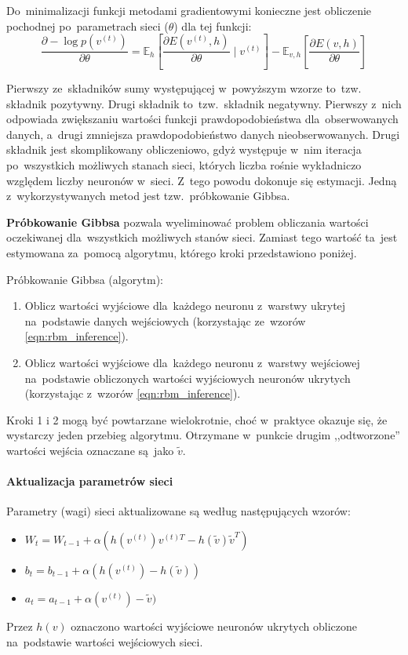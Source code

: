 Do~minimalizacji funkcji metodami gradientowymi konieczne jest obliczenie pochodnej po~parametrach sieci ($\theta$)
dla tej funkcji:
$$\frac{\partial-\log{p(v^{(t)})}}{\partial{\theta}}=\mathbb{E}_h[\frac{\partial{E(v^{(t)},h)}}{\partial{\theta}}\mid{v^{(t)}}]-\mathbb{E}_{v,h}[\frac{\partial{E(v,h)}}{\partial{\theta}}]$$

Pierwszy ze~składników sumy występującej w~powyższym wzorze to~tzw. składnik pozytywny. Drugi składnik
to~tzw.~składnik negatywny. Pierwszy z~nich odpowiada zwiększaniu wartości funkcji prawdopodobieństwa
dla~obserwowanych danych, a~drugi zmniejsza prawdopodobieństwo danych nieobserwowanych. Drugi składnik jest
skomplikowany obliczeniowo, gdyż występuje w~nim iteracja po~wszystkich możliwych stanach sieci, których
liczba rośnie wykładniczo względem liczby neuronów w~sieci. Z~tego powodu dokonuje się estymacji. Jedną
z~wykorzystywanych metod jest tzw.~próbkowanie Gibbsa.

\textbf{Próbkowanie Gibbsa} pozwala wyeliminować problem obliczania wartości oczekiwanej dla~wszystkich
możliwych stanów sieci. Zamiast tego wartość ta~jest estymowana za~pomocą algorytmu, którego kroki
przedstawiono poniżej.

Próbkowanie Gibbsa (algorytm):
\begin{enumerate}
  \item Oblicz wartości wyjściowe dla~każdego neuronu z~warstwy ukrytej na~podstawie danych wejściowych
  (korzystając ze~wzorów \ref{eqn:rbm_inference}).
  \item Oblicz wartości wyjściowe dla~każdego neuronu z~warstwy wejściowej na~podstawie obliczonych wartości
  wyjściowych neuronów ukrytych (korzystając z~wzorów \ref{eqn:rbm_inference}).
\end{enumerate}

Kroki 1 i 2 mogą być powtarzane wielokrotnie, choć w~praktyce okazuje się, że wystarczy jeden
przebieg algorytmu. Otrzymane w~punkcie drugim ,,odtworzone'' wartości wejścia oznaczane są~jako $\tilde{v}$.

\paragraph{Aktualizacja parametrów sieci}
Parametry (wagi) sieci aktualizowane są według następujących wzorów:
\begin{itemize}
  \item $W_t=W_{t-1}+\alpha(h(v^{(t)})v^{(t)T}-h(\tilde{v})\tilde{v}^{T})$
  \item $b_t=b_{t-1}+\alpha(h(v^{(t)})-h(\tilde{v}))$
  \item $a_t=a_{t-1}+\alpha(v^{(t)})-\tilde{v})$
\end{itemize}
\vspace{1cm}

Przez $h(v)$ oznaczono wartości wyjściowe neuronów ukrytych obliczone na~podstawie wartości wejściowych sieci.
